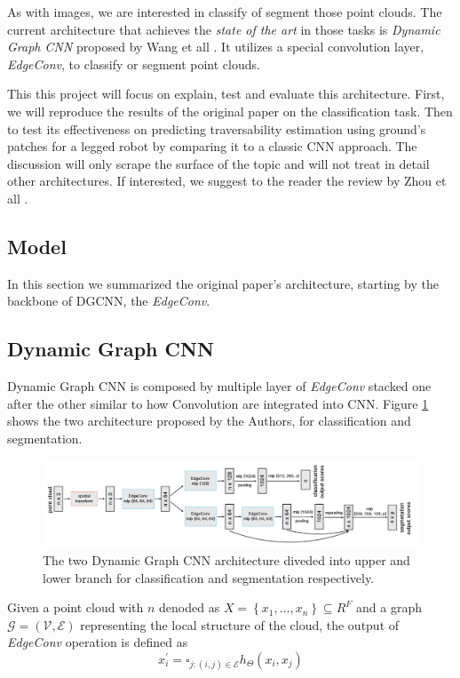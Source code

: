 \documentclass[twocolumn,showpacs,%
  nofootinbib,aps,superscriptaddress,%
  eqsecnum,prd,notitlepage,showkeys,10pt]{revtex4-1}
\begin{document}
As with images, we are interested in classify of segment those point clouds. The current architecture that achieves the \emph{state of the art} in those tasks is \emph{Dynamic Graph CNN} proposed by Wang et all \cite{dgcnn}. It utilizes a special convolution layer,  \emph{EdgeConv}, to classify or segment point clouds. 

This this project will focus on explain, test and evaluate this architecture. First, we will reproduce the results of the original paper on the classification task. Then to test its effectiveness on predicting traversability estimation using ground's patches for a legged robot by comparing it to a classic CNN approach. The discussion will only scrape the surface of the topic and will not treat in detail other architectures. If interested, we suggest to the reader the review by Zhou et all \cite{1812.08434}.
\subsection{Model}
In this section we summarized the original paper's architecture, starting by the backbone of DGCNN, the \emph{EdgeConv}.
\subsection{Dynamic Graph CNN}
Dynamic Graph CNN is composed by multiple layer of \emph{EdgeConv} stacked one after the other similar to how Convolution are integrated into CNN. Figure \ref{fig : DGCNN} shows the two architecture proposed by the Authors, for classification and segmentation. 
\begin{figure}
  \centering
  \includegraphics[width=\linewidth]{images/DGCNN.png}
\caption{The two Dynamic Graph CNN architecture diveded into upper and lower branch for classification and segmentation respectively.}
\label{fig : DGCNN}
\end{figure}

Given a point cloud with $n$ denoded as $X=\left\{x_{1}, \ldots, x_{n}\right\} \subseteq R^{F}$ and a graph $\mathcal{G}=(\mathcal{V}, \mathcal{E})$ representing the local structure of the cloud, the output of \emph{EdgeConv} operation is defined as
\begin{equation}
  x_{i}^{\prime}=\square_{j :(i, j) \in \mathcal{E}} h_{\Theta}\left(x_{i}, x_{j}\right)
  \end{equation}
\end{document}
